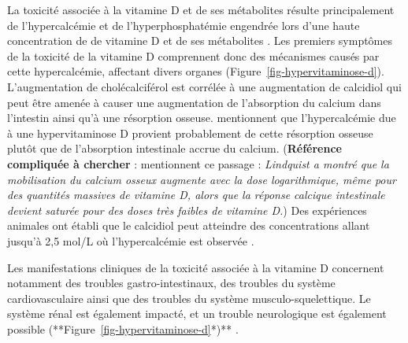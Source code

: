 \documentclass[
  a4paper,
  DIV=11,
  numbers=noendperiod,
  listof=totoc]{scrreprt}
\begin{document}
La toxicité associée à la vitamine D et de ses métabolites résulte
principalement de l'hypercalcémie et de l'hyperphosphatémie engendrée
lors d'une haute concentration de de vitamine D et de ses métabolites
\autocites[ ]{DeLuca.2011}{Janoušek.2022}. Les premiers symptômes de la
toxicité de la vitamine D comprennent donc des mécanismes causés par
cette hypercalcémie, affectant divers organes
(Figure~\ref{fig-hypervitaminose-d}). L'augmentation de cholécalciférol
est corrélée à une augmentation de calcidiol qui peut être amenée à
causer une augmentation de l'absorption du calcium dans l'intestin ainsi
qu'à une résorption osseuse. \textcite{Shepard.1980} mentionnent que
l'hypercalcémie due à une hypervitaminose D provient probablement de
cette résorption osseuse plutôt que de l'absorption intestinale accrue
du calcium. (\textbf{Référence compliquée à chercher} :
\textcite{Shepard.1980} mentionnent ce passage : \emph{Lindquist
\autocite{Lindquist.1952} a montré que la mobilisation du calcium osseux
augmente avec la dose logarithmique, même pour des quantités massives de
vitamine D, alors que la réponse calcique intestinale devient saturée
pour des doses très faibles de vitamine D.}) Des expériences animales
ont établi que le calcidiol peut atteindre des concentrations allant
jusqu'à 2,5 mol/L où l'hypercalcémie est observée \autocite{Jones.2008}.

Les manifestations cliniques de la toxicité associée à la vitamine D
concernent notamment des troubles gastro-intestinaux, des troubles du
système cardiovasculaire ainsi que des troubles du système
musculo-squelettique. Le système rénal est également impacté, et un
trouble neurologique est également possible
(**Figure~\ref{fig-hypervitaminose-d}*)** \autocites[
]{Alshahrani.2013}{Janoušek.2022}.
\end{document}
